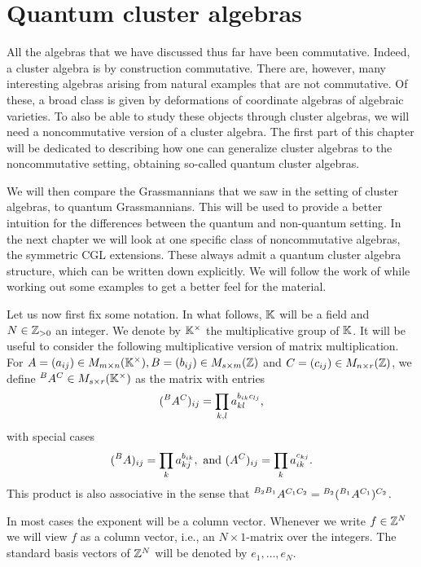 
\chapter{Quantum cluster algebras}
All the algebras that we have discussed thus far have been commutative. Indeed, a
cluster algebra is by construction commutative. There are, however, many interesting
algebras arising from natural examples that are not commutative. Of these, a broad
class is given by deformations of coordinate algebras of algebraic varieties. To also
be able to study these objects through cluster algebras, we will need a noncommutative
version of a cluster algebra. The first part of this chapter will be dedicated to
describing how one can generalize cluster algebras to the noncommutative setting,
obtaining so-called quantum cluster algebras.

We will then compare the Grassmannians that we saw in the setting of cluster algebras,
to quantum Grassmannians. This will be used to provide a better intuition for the
differences between the quantum and non-quantum setting. In the next chapter we will
look at one specific class of noncommutative algebras, the symmetric CGL extensions.
These always admit a quantum cluster algebra structure, which can be written down
explicitly. We will follow the work of \cite{GoodearlYakimov2017QCA} while working out
some examples to get a better feel for the material.

Let us now first fix some notation. In what follows, $\mathbb{K}$ will be a field and $N \in
	\mathbb{Z}_{> 0}$ an integer. We denote by $\mathbb{K}^\times$ the multiplicative group of $\mathbb{K}$.
It will be useful to consider the following multiplicative version of matrix
multiplication. For $A = (a_{ij}) \in M_{m \times n}(\mathbb{K}^\times), B = (b_{ij}) \in
	M_{s \times m}(\mathbb{Z})$ and $C = (c_{ij}) \in M_{n \times r} (\mathbb{Z})$, we define
$\prescript{B}{}{}A^C \in M_{s \times r}(\mathbb{K}^\times)$ as the matrix with entries
\begin{equation*}
	(\prescript{B}{}{A}^C)_{ij} = \prod_{k, l} a_{kl}^{b_{ik}c_{lj}},
\end{equation*}
%
with special cases
\begin{equation*}
	(\prescript{B}{}{A})_{ij} = \prod_{k} a_{kj}^{b_{ik}}, \text{ and }	(A^C)_{ij} = \prod_{k} a_{ik}^{c_{kj}}.
\end{equation*}
%
This product is also associative in the sense that $\prescript{B_2 B_1}{}{A}^{C_1 C_2}
	= \prescript{B_2}{}{}(\prescript{B_1}{}{}A^{C_1})^{C_2}$.

In most cases the exponent will be a column vector. Whenever we write $f \in \mathbb{Z}^N$ we
will view $f$ as a column vector, i.e., an $N \times 1$-matrix over the integers. The
standard basis vectors of $\mathbb{Z}^N$ will be denoted by $e_1, \dots, e_N$.

